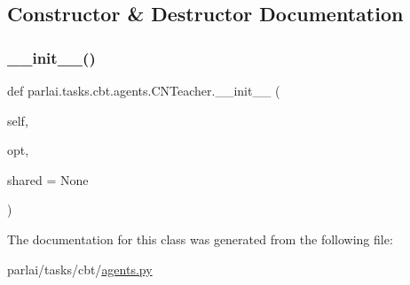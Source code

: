 \subsection{Constructor \& Destructor Documentation}
\mbox{\label{classparlai_1_1tasks_1_1cbt_1_1agents_1_1CNTeacher_a68b96e17407acfb0c7583b2da47a1f51}} 
\subsubsection{\texorpdfstring{\+\_\+\+\_\+init\+\_\+\+\_\+()}{\_\_init\_\_()}}
{\footnotesize\ttfamily def parlai.\+tasks.\+cbt.\+agents.\+C\+N\+Teacher.\+\_\+\+\_\+init\+\_\+\+\_\+ (\begin{DoxyParamCaption}\item[{}]{self,  }\item[{}]{opt,  }\item[{}]{shared = {\ttfamily None} }\end{DoxyParamCaption})}



The documentation for this class was generated from the following file\+:\begin{DoxyCompactItemize}
\item 
parlai/tasks/cbt/\hyperlink{parlai_2tasks_2cbt_2agents_8py}{agents.\+py}\end{DoxyCompactItemize}
